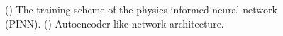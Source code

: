 \documentclass[letterpaper]{article} %
\begin{document}
\begin{figure}[t]
\begin{subfigure}[t]{0.65\textwidth}
\centering

\label{fig:PINN diagram}
\end{subfigure}
\hfill
\begin{subfigure}[t]{0.35\textwidth}
\centering
{}

\label{fig:AE diagram}
\end{subfigure}
\caption{() The training scheme of the physics-informed neural network (PINN).
        () Autoencoder-like network architecture.}
\end{figure}

\end{document}
